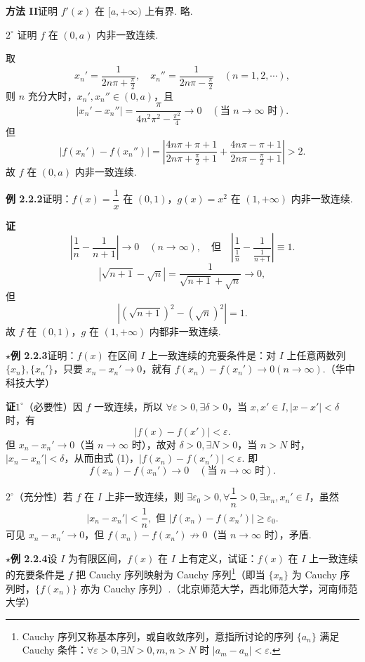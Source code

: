 \documentclass[UTF8, 12pt, fontset=fandol, oneside]{ctexart}
\begin{document}
\noindent\textbf{方法 II}\quad 证明 $f'(x)$ 在 $[a,+\infty)$ 上有界. 略.

$2^\circ$ 证明 $f$ 在 $(0,a)$ 内非一致连续.

取
\[
  x_n'=\frac1{2n\pi+\frac\pi2},\quad
  x_n''=\frac1{2n\pi-\frac\pi2}\quad(n=1,2,\cdots),
\]
则 $n$ 充分大时，$x_n',x_n''\in(0,a)$，且
\[
  |x_n'-x_n''|=\frac{\pi}{4n^2\pi^2-\frac{\pi^2}{4}}\to0\quad(\text{当 }n\to\infty\text{ 时}).
\]
但
\[
  |f(x_n')-f(x_n'')|
  =\left|\frac{4n\pi+\pi+1}{2n\pi+\frac\pi2+1}
  +\frac{4n\pi-\pi+1}{2n\pi-\frac\pi2+1}\right|>2.
\]
故 $f$ 在 $(0,a)$ 内非一致连续.

\noindent\textbf{例 2.2.2}\quad 证明：$f(x)=\dfrac1x$ 在 $(0,1)$，$g(x)=x^2$ 在 $(1,+\infty)$ 内非一致连续.

\noindent\textbf{证}\quad
\[
  \left|\frac1n-\frac1{n+1}\right|\to0\quad(n\to\infty),
  \quad\text{但}\quad
  \left|\frac1{\frac1n}-\frac1{\frac1{n+1}}\right|\equiv1.
\]
\[
  |\sqrt{n+1}-\sqrt n|=\frac1{\sqrt{n+1}+\sqrt n}\to0,
\]
但
\[
  \left|(\sqrt{n+1})^2-(\sqrt n)^2\right|=1.
\]
故 $f$ 在 $(0,1)$，$g$ 在 $(1,+\infty)$ 内都非一致连续.

\noindent\textbf{$\star$例 2.2.3}\quad 证明：$f(x)$ 在区间 $I$ 上一致连续的充要条件是：对 $I$ 上任意两数列 $\{x_n\},\{x_n'\}$，只要 $x_n-x_n'\to0$，就有 $f(x_n)-f(x_n')\to0(n\to\infty)$.（华中科技大学）

\noindent\textbf{证}\quad $1^\circ$（必要性）因 $f$ 一致连续，所以 $\forall\varepsilon>0,\exists\delta>0$，当 $x,x'\in I,|x-x'|<\delta$ 时，有
\[
  |f(x)-f(x')|<\varepsilon. \tag{1}
\]
但 $x_n-x_n'\to0$（当 $n\to\infty$ 时），故对 $\delta>0,\exists N>0$，当 $n>N$ 时，$|x_n-x_n'|<\delta$，从而由式 (1)，$|f(x_n)-f(x_n')|<\varepsilon$. 即
\[
  f(x_n)-f(x_n')\to0\quad(\text{当 }n\to\infty\text{ 时}).
\]

$2^\circ$（充分性）若 $f$ 在 $I$ 上非一致连续，则 $\exists\varepsilon_0>0,\forall\dfrac1n>0,\exists x_n,x_n'\in I$，虽然
\[
  |x_n-x_n'|<\frac1n,\text{ 但 } |f(x_n)-f(x_n')|\ge\varepsilon_0.
\]
可见 $x_n-x_n'\to0$，但 $f(x_n)-f(x_n')\not\to0$（当 $n\to\infty$ 时），矛盾.

\noindent\textbf{$\star$例 2.2.4}\quad 设 $I$ 为有限区间，$f(x)$ 在 $I$ 上有定义，试证：$f(x)$ 在 $I$ 上一致连续的充要条件是 $f$ 把 Cauchy 序列映射为 Cauchy 序列\footnote{Cauchy 序列又称基本序列，或自收敛序列，意指所讨论的序列 $\{a_n\}$ 满足 Cauchy 条件：$\forall\varepsilon>0,\exists N>0,m,n>N$ 时 $|a_m-a_n|<\varepsilon$.}（即当 $\{x_n\}$ 为 Cauchy 序列时，$\{f(x_n)\}$ 亦为 Cauchy 序列）.（北京师范大学，西北师范大学，河南师范大学）
\end{document}
